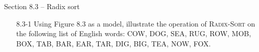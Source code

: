 \newpage

{\large Section 8.3 {--} Radix sort}

\begin{enumerate}

\item[8.3-1]{Using Figure 8.3 as a model, illustrate the operation of
\textsc{Radix-Sort} on the following list of English words: COW, DOG, SEA, RUG,
ROW, MOB, BOX, TAB, BAR, EAR, TAR, DIG, BIG, TEA, NOW, FOX.}

\end{enumerate}

